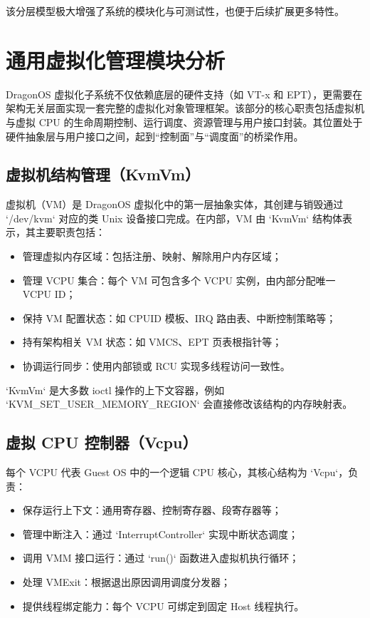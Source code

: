 \documentclass[analyze]{mancls}
\begin{document}
该分层模型极大增强了系统的模块化与可测试性，也便于后续扩展更多特性。


\section{通用虚拟化管理模块分析}

DragonOS 虚拟化子系统不仅依赖底层的硬件支持（如 VT-x 和 EPT），更需要在架构无关层面实现一套完整的虚拟化对象管理框架。该部分的核心职责包括虚拟机与虚拟 CPU 的生命周期控制、运行调度、资源管理与用户接口封装。其位置处于硬件抽象层与用户接口之间，起到“控制面”与“调度面”的桥梁作用。

\subsection{虚拟机结构管理（KvmVm）}
虚拟机（VM）是 DragonOS 虚拟化中的第一层抽象实体，其创建与销毁通过 `/dev/kvm` 对应的类 Unix 设备接口完成。在内部，VM 由 `KvmVm` 结构体表示，其主要职责包括：

\begin{itemize}
    \item 管理虚拟内存区域：包括注册、映射、解除用户内存区域；
    \item 管理 VCPU 集合：每个 VM 可包含多个 VCPU 实例，由内部分配唯一 VCPU ID；
    \item 保持 VM 配置状态：如 CPUID 模板、IRQ 路由表、中断控制策略等；
    \item 持有架构相关 VM 状态：如 VMCS、EPT 页表根指针等；
    \item 协调运行同步：使用内部锁或 RCU 实现多线程访问一致性。
\end{itemize}

`KvmVm` 是大多数 ioctl 操作的上下文容器，例如 `KVM\_SET\_USER\_MEMORY\_REGION` 会直接修改该结构的内存映射表。

\subsection{虚拟 CPU 控制器（Vcpu）}
每个 VCPU 代表 Guest OS 中的一个逻辑 CPU 核心，其核心结构为 `Vcpu`，负责：

\begin{itemize}
    \item 保存运行上下文：通用寄存器、控制寄存器、段寄存器等；
    \item 管理中断注入：通过 `InterruptController` 实现中断状态调度；
    \item 调用 VMM 接口运行：通过 `run()` 函数进入虚拟机执行循环；
    \item 处理 VMExit：根据退出原因调用调度分发器；
    \item 提供线程绑定能力：每个 VCPU 可绑定到固定 Host 线程执行。
\end{itemize}
\end{document}
